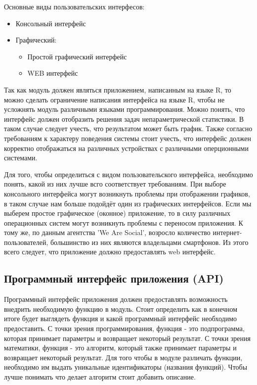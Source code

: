 \documentclass[14pt,a4paper]{scrartcl}
\begin{document}
    Основные виды пользовательских интерфесов:
    \begin{itemize}
        \item Консольный интерфейс
        \item Графический:
        \begin{itemize}
            \item Простой графический интерфейс
            \item WEB интерфейс
        \end{itemize}
    \end{itemize}

    Так как модуль должен являться приложением, написанным на языке R, то можно сделать ограничение написания интерфейса на языке R, чтобы не усложнять модуль различными языками программирования. Можно понять, что интерфейс должен отобразить решения задач непараметрической статистики. В таком случае следует учесть, что результатом может быть график. Также согласно требованиям к характеру поведения системы стоит учесть, что интерфейс должен корректно отображаться на различных устройствах с различными оперционными системами.

    Для того, чтобы определиться с видом пользовательского интерфейса, необходимо понять, какой из них лучше всго соответствует требованиям. При выборе консольного интерфейса могут возникнуть проблемы при отображении графиков, в таком случае нам больше подойдёт один из графических интерфейсов. Если мы выберем простое графическое (оконное) приложение, то в силу различных операционных систем могут возникнуть проблемы с переносом приложения. К тому же, по данным агентства 'We Are Social', возросло количество интернет-пользователей, большинство из них являются владельцами смартфонов\cite{Internet-statistic-2018}. Из этого всего следует, что приложение должно предоставлять web интерфейс.

    \subsection[Программный интерфейс приложения]{Программный интерфейс приложения (API)}
    Программный интерфейс приложения должен предоставлять возможность внедрить необходимую функцию в модуль. Стоит определить как в конечном итоге будет выглядеть функция и какой программный интерфейс необходимо предоставить. С точки зрения программирования, функция - это подпрограмма, которая принимает параметры и возвращает некоторый результат. С точки зрения математики, функция - это алгоритм, который также принимает параметры и возвращает некоторый результат. Для того чтобы в модуле различать функции, необходимо им выдать уникальные идентификаторы (названия функций). Чтобы лучше понимать что делает алгоритм стоит добавить описание.
\end{document}
